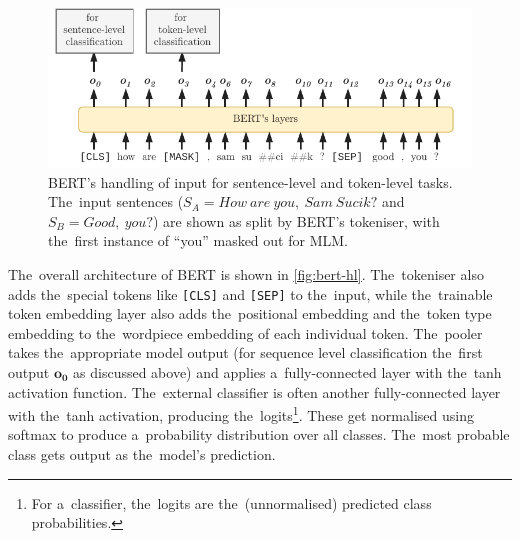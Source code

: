 \documentclass[bsc,frontabs,singlespacing,parskip,deptreport]{infthesis}
\begin{document}
{{{      \begin{figure}[h!t]
        \centering
        \includegraphics[width=14cm]{graphics/bert-inputs}
        \caption{BERT's handling of input for sentence-level and token-level tasks. The~input sentences ($S_A = How\ are\ you,\ Sam\ Sucik?$ and $S_B = Good,\ you?$) are shown as split by BERT's tokeniser, with the~first instance of ``you'' masked out for MLM.}
        \label{fig:bert-inputs}
      \end{figure}
      The~overall architecture of BERT is shown in \autoref{fig:bert-hl}. The~tokeniser also adds the~special tokens like \verb|[CLS]| and \verb|[SEP]| to the~input, while the~trainable token embedding layer also adds the~positional embedding and the~token type embedding to the~wordpiece embedding of each individual token. The~pooler takes the~appropriate model output (for sequence level classification the~first output $\bm{o_0}$ as discussed above) and applies a~fully-connected layer with the~tanh activation function.
      The~external classifier is often another fully-connected layer with the~tanh activation, producing the~logits\footnote{For a~classifier, the~logits are the~(unnormalised) predicted class probabilities.}. These get normalised using softmax to produce a~probability distribution over all classes. The~most probable class gets output as the~model's prediction.
      
}}}
\end{document}
